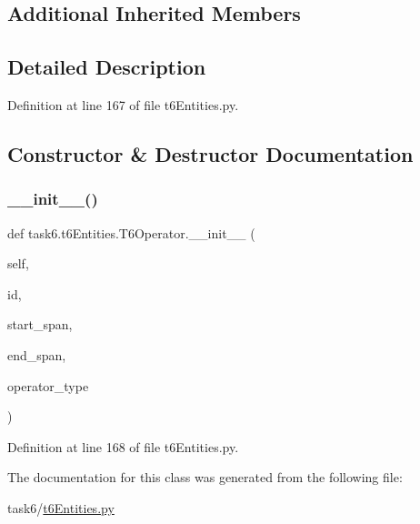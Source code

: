 \subsection*{Additional Inherited Members}


\subsection{Detailed Description}


Definition at line 167 of file t6\+Entities.\+py.



\subsection{Constructor \& Destructor Documentation}
\mbox{\label{classtask6_1_1t6Entities_1_1T6Operator_a2439f51a00c049e0e5e77472e2115b63}} 
\subsubsection{\texorpdfstring{\+\_\+\+\_\+init\+\_\+\+\_\+()}{\_\_init\_\_()}}
{\footnotesize\ttfamily def task6.\+t6\+Entities.\+T6\+Operator.\+\_\+\+\_\+init\+\_\+\+\_\+ (\begin{DoxyParamCaption}\item[{}]{self,  }\item[{}]{id,  }\item[{}]{start\+\_\+span,  }\item[{}]{end\+\_\+span,  }\item[{}]{operator\+\_\+type }\end{DoxyParamCaption})}



Definition at line 168 of file t6\+Entities.\+py.



The documentation for this class was generated from the following file\+:\begin{DoxyCompactItemize}
\item 
task6/\hyperlink{t6Entities_8py}{t6\+Entities.\+py}\end{DoxyCompactItemize}

